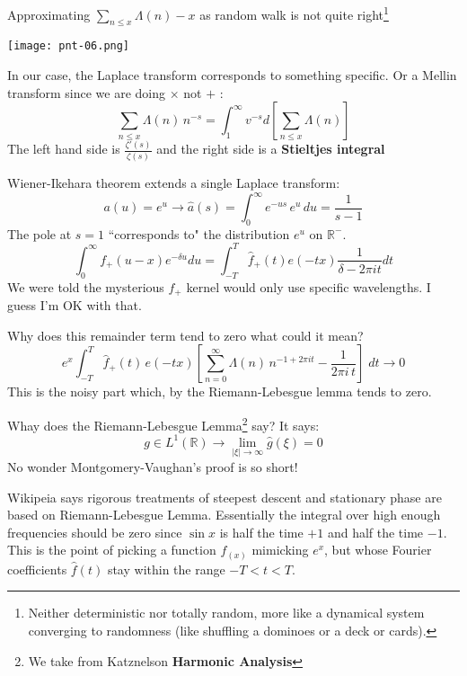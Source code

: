 \documentclass[12pt]{article}
\begin{document}
\newpage

\noindent Approximating $\sum_{n \leq x} \Lambda(n) - x$ as random walk is not quite right\footnote{Neither deterministic nor totally random, more like a dynamical system converging to randomness (like shuffling a dominoes or a deck or cards).}

\texttt{[image: pnt-06.png]}


\newpage

\noindent In our case, the Laplace transform corresponds to something specific.  Or a Mellin transform since we are doing $\times$ not $+$ :
$$  \sum_{n \leq x} \Lambda(n) \, n^{-s}= \int_1^\infty v^{-s} d \left[ \sum_{n \leq x} \Lambda(n) \right]$$
The left hand side is $\frac{\zeta'(s)}{\zeta(s)} $ and the right side is a \textbf{Stieltjes integral} \newline

\noindent Wiener-Ikehara theorem extends a single Laplace transform:
$$ a(u)=e^u \to \hat{a}(s)=\int_0^\infty e^{-us}\, e^u \, du = \frac{1}{s-1} $$
The pole at $s=1$ ``corresponds to" the distribution $e^u$ on $\mathbb{R}^-$.
$$ \int_0^\infty f_+(u-x)e^{-\delta u} du
= \int_{-T}^T \hat{f}_+(t) e(-tx) \frac{1}{\delta - 2\pi i t} dt$$
We were told the mysterious $f_+$ kernel would only use specific wavelengths.  I guess I'm OK with that.

\newpage

\noindent Why does this remainder term tend to zero what could it mean?
$$ e^x \int_{-T}^T \hat{f}_+(t) \, e(-tx) \left[ \sum_{n =0}^\infty \Lambda(n) \, n^{-1 + 2\pi i t} - \frac{1}{2\pi i \, t} \right] \; dt \longrightarrow 0 $$
This is the noisy part which, by the Riemann-Lebesgue lemma tends to zero.  \newline

\noindent Whay does the Riemann-Lebesgue Lemma\footnote{We take from Katznelson \textbf{Harmonic Analysis}} say? It says:
$$ g \in L^1(\mathbb{R}) \longrightarrow \lim_{|\xi|\to \infty}\hat{g}(\xi)=0$$
No wonder Montgomery-Vaughan's proof is so short!  \newline

\selectfont \fontsize{15}{10}\selectfont

\noindent Wikipeia says rigorous treatments of steepest descent and stationary phase are based on Riemann-Lebesgue Lemma. Essentially the integral over high enough frequencies should be zero since $\sin x$ is half the time $+1$ and half the time $-1$.  This is the point of picking a function $f_(x)$ mimicking $e^x$, but whose Fourier coefficients $\hat{f}(t)$ stay within the range $-T < t < T$.
\end{document}
